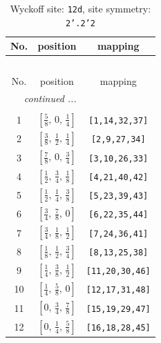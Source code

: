 \documentclass[fleqn,8pt]{jsarticle}
\begin{document}
\begin{longtable}{ccc}
\caption{Wyckoff site: {\tt 12d}, site symmetry: {\tt 2'.2'2}}
 \\
 \hline \hline
No. & position & mapping \\ \hline \endfirsthead

\multicolumn{2}{l}{\tablename\ \thetable{}} \\
 \hline \hline
No. & position & mapping \\ \hline \endhead

 \hline \hline
\multicolumn{2}{r}{\footnotesize\it continued ...} \\ \endfoot

 \hline \hline
\multicolumn{2}{r}{} \\ \endlastfoot

1 & $\left[ \frac{5}{8},\, 0,\, \frac{1}{4} \right]$ & {\tt [1,14,32,37]} \\ \hline
2 & $\left[ \frac{3}{8},\, \frac{1}{2},\, \frac{1}{4} \right]$ & {\tt [2,9,27,34]} \\ \hline
3 & $\left[ \frac{7}{8},\, 0,\, \frac{3}{4} \right]$ & {\tt [3,10,26,33]} \\ \hline
4 & $\left[ \frac{1}{2},\, \frac{3}{4},\, \frac{1}{8} \right]$ & {\tt [4,21,40,42]} \\ \hline
5 & $\left[ \frac{1}{2},\, \frac{1}{4},\, \frac{3}{8} \right]$ & {\tt [5,23,39,43]} \\ \hline
6 & $\left[ \frac{3}{4},\, \frac{7}{8},\, 0 \right]$ & {\tt [6,22,35,44]} \\ \hline
7 & $\left[ \frac{3}{4},\, \frac{1}{8},\, \frac{1}{2} \right]$ & {\tt [7,24,36,41]} \\ \hline
8 & $\left[ \frac{1}{8},\, \frac{1}{2},\, \frac{3}{4} \right]$ & {\tt [8,13,25,38]} \\ \hline
9 & $\left[ \frac{1}{4},\, \frac{3}{8},\, \frac{1}{2} \right]$ & {\tt [11,20,30,46]} \\ \hline
10 & $\left[ \frac{1}{4},\, \frac{5}{8},\, 0 \right]$ & {\tt [12,17,31,48]} \\ \hline
11 & $\left[ 0,\, \frac{3}{4},\, \frac{7}{8} \right]$ & {\tt [15,19,29,47]} \\ \hline
12 & $\left[ 0,\, \frac{1}{4},\, \frac{5}{8} \right]$ & {\tt [16,18,28,45]} \\
\end{longtable}
\renewcommand{\arraystretch}{1.2}
\end{document}
